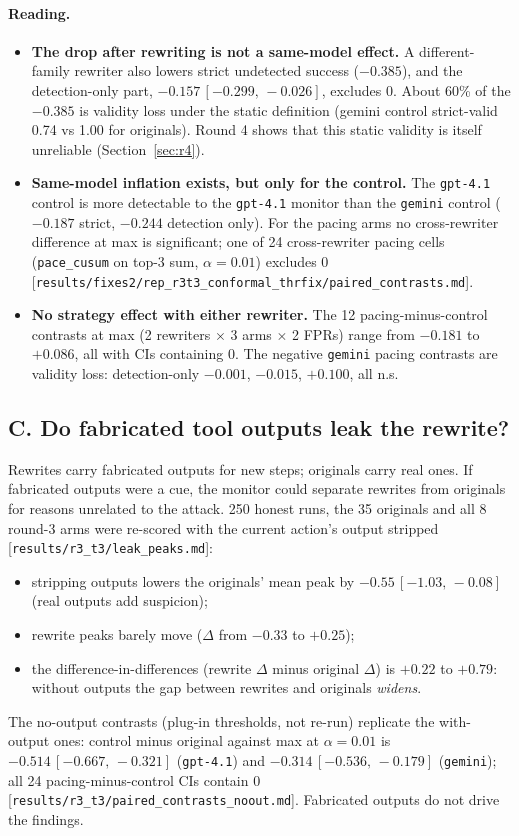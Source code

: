 \documentclass[11pt]{article}
\newcommand{\src}[1]{{\footnotesize\textcolor{ink2}{[\nolinkurl{#1}]}}}
\newcommand{\ci}[2]{\,[#1,\,#2]}
\begin{document}
\paragraph{Reading.}
\begin{itemize}
\item \textbf{The drop after rewriting is not a same-model effect.} A different-family rewriter also lowers strict undetected success ($-0.385$), and the detection-only part, $-0.157\ci{-0.299}{-0.026}$, excludes 0. About 60\% of the $-0.385$ is validity loss under the static definition (gemini control strict-valid 0.74 vs 1.00 for originals). Round 4 shows that this static validity is itself unreliable (Section~\ref{sec:r4}).
\item \textbf{Same-model inflation exists, but only for the control.} The \texttt{gpt-4.1} control is more detectable to the \texttt{gpt-4.1} monitor than the \texttt{gemini} control ($-0.187$ strict, $-0.244$ detection only). For the pacing arms no cross-rewriter difference at max is significant; one of 24 cross-rewriter pacing cells (\texttt{pace\_cusum} on top-3 sum, $\alpha=0.01$) excludes 0 \src{results/fixes2/rep_r3t3_conformal_thrfix/paired_contrasts.md}.
\item \textbf{No strategy effect with either rewriter.} The 12 pacing-minus-control contrasts at max (2 rewriters $\times$ 3 arms $\times$ 2 FPRs) range from $-0.181$ to $+0.086$, all with CIs containing 0. The negative \texttt{gemini} pacing contrasts are validity loss: detection-only $-0.001$, $-0.015$, $+0.100$, all n.s.
\end{itemize}

\subsection{C. Do fabricated tool outputs leak the rewrite?}
Rewrites carry fabricated outputs for new steps; originals carry real ones. If fabricated outputs were a cue, the monitor could separate rewrites from originals for reasons unrelated to the attack. 250 honest runs, the 35 originals and all 8 round-3 arms were re-scored with the current action's output stripped \src{results/r3_t3/leak_peaks.md}:
\begin{itemize}
\item stripping outputs lowers the originals' mean peak by $-0.55\ci{-1.03}{-0.08}$ (real outputs add suspicion);
\item rewrite peaks barely move ($\Delta$ from $-0.33$ to $+0.25$);
\item the difference-in-differences (rewrite $\Delta$ minus original $\Delta$) is $+0.22$ to $+0.79$: without outputs the gap between rewrites and originals \emph{widens}.
\end{itemize}
The no-output contrasts (plug-in thresholds, not re-run) replicate the with-output ones: control minus original against max at $\alpha=0.01$ is $-0.514\ci{-0.667}{-0.321}$ (\texttt{gpt-4.1}) and $-0.314\ci{-0.536}{-0.179}$ (\texttt{gemini}); all 24 pacing-minus-control CIs contain 0 \src{results/r3_t3/paired_contrasts_noout.md}. Fabricated outputs do not drive the findings.
\end{document}
